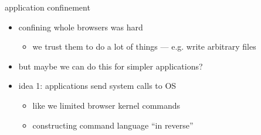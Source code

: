 \begin{frame}{application confinement}
    \begin{itemize}
    \item confining whole browsers was hard
        \begin{itemize}
            \item we trust them to do a lot of things --- e.g. write arbitrary files
        \end{itemize}
    \item but maybe we can do this for simpler applications?
    \item idea 1: applications send system calls to OS 
        \begin{itemize}
        \item {} like we limited browser kernel commands
        \item constructing command language ``in reverse''
        \end{itemize}
    \end{itemize}
\end{frame}

